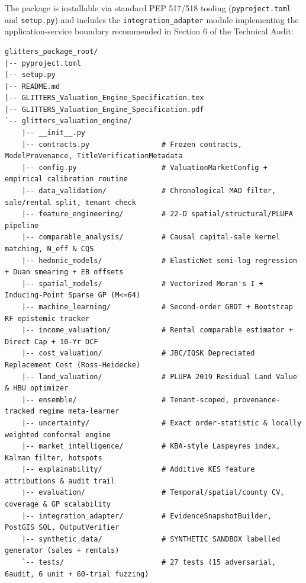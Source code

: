 \documentclass[11pt,a4paper]{article}
\begin{document}
The package is installable via standard PEP 517/518 tooling (\texttt{pyproject.toml} and \texttt{setup.py}) and includes the \texttt{integration\_adapter} module implementing the application-service boundary recommended in Section 6 of the Technical Audit:
\begin{lstlisting}
glitters_package_root/
|-- pyproject.toml
|-- setup.py
|-- README.md
|-- GLITTERS_Valuation_Engine_Specification.tex
|-- GLITTERS_Valuation_Engine_Specification.pdf
`-- glitters_valuation_engine/
    |-- __init__.py
    |-- contracts.py                 # Frozen contracts, ModelProvenance, TitleVerificationMetadata
    |-- config.py                    # ValuationMarketConfig + empirical calibration routine
    |-- data_validation/             # Chronological MAD filter, sale/rental split, tenant check
    |-- feature_engineering/         # 22-D spatial/structural/PLUPA pipeline
    |-- comparable_analysis/         # Causal capital-sale kernel matching, N_eff & CQS
    |-- hedonic_models/              # ElasticNet semi-log regression + Duan smearing + EB offsets
    |-- spatial_models/              # Vectorized Moran's I + Inducing-Point Sparse GP (M<=64)
    |-- machine_learning/            # Second-order GBDT + Bootstrap RF epistemic tracker
    |-- income_valuation/            # Rental comparable estimator + Direct Cap + 10-Yr DCF
    |-- cost_valuation/              # JBC/IQSK Depreciated Replacement Cost (Ross-Heidecke)
    |-- land_valuation/              # PLUPA 2019 Residual Land Value & HBU optimizer
    |-- ensemble/                    # Tenant-scoped, provenance-tracked regime meta-learner
    |-- uncertainty/                 # Exact order-statistic & locally weighted conformal engine
    |-- market_intelligence/         # KBA-style Laspeyres index, Kalman filter, hotspots
    |-- explainability/              # Additive KES feature attributions & audit trail
    |-- evaluation/                  # Temporal/spatial/county CV, coverage & GP scalability
    |-- integration_adapter/         # EvidenceSnapshotBuilder, PostGIS SQL, OutputVerifier
    |-- synthetic_data/              # SYNTHETIC_SANDBOX labelled generator (sales + rentals)
    `-- tests/                       # 27 tests (15 adversarial, 6audit, 6 unit + 60-trial fuzzing)
\end{lstlisting}
\end{document}
